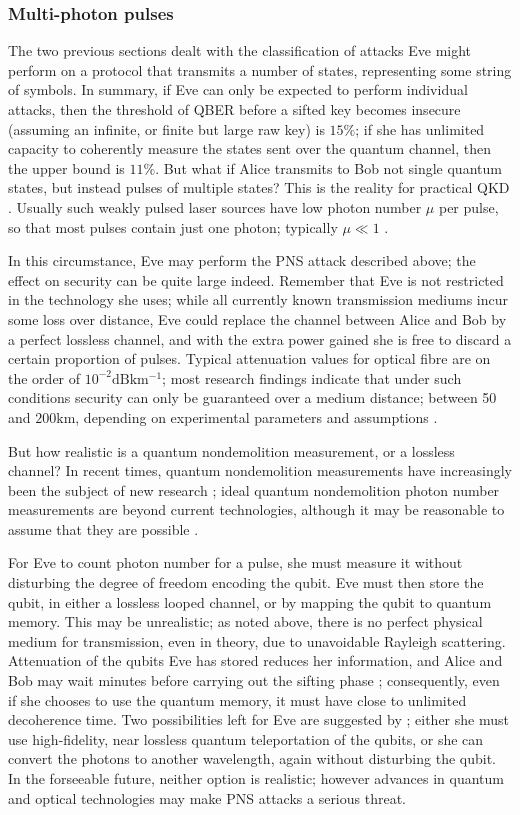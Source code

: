 \documentclass[paper=a4, fontsize=11pt]{scrartcl} %
\numberwithin{equation}{section} %
\numberwithin{figure}{section} %
\numberwithin{table}{section} %
\begin{document}
\subsubsection{Multi-photon pulses}
The two previous sections dealt with the classification of attacks Eve might perform on a protocol
that transmits a number of states, representing some string of symbols. In summary, if Eve can only be
expected to perform individual attacks, then the threshold of QBER before a sifted key becomes insecure
(assuming an infinite, or finite but large raw key) is $15\%$; if she has unlimited capacity to coherently measure
the states sent over the quantum channel, then the upper bound is $11\%$. But what if Alice transmits to Bob
not single quantum states, but instead pulses of multiple states? This is the reality for practical QKD \citep{huttner1995}.
Usually such weakly pulsed laser sources have low photon number $\mu$ per pulse, so that most pulses contain
just one photon; typically $\mu \ll 1$ \citep{reviewScariani}.

In this circumstance, Eve may perform the PNS attack described above; the effect on security can be quite large
indeed. Remember that Eve is not restricted in the technology she uses; while all currently known transmission
mediums incur some loss over distance, Eve could replace the channel between Alice and Bob by a perfect
lossless channel, and with the extra power gained she is free to discard a certain proportion of pulses. Typical
attenuation values for optical fibre are on the order of $10^{-2} \si{\dB \km^{-1}}$; most research findings indicate that
under such conditions security can only be guaranteed over a medium distance; between 50 and $200\si{\km}$, depending on experimental
parameters and assumptions \citep{perf2protocols, satellites, experimentalComparison}.

But how realistic is a quantum nondemolition measurement, or a lossless channel? In recent times,
quantum nondemolition measurements have increasingly been the subject of new research \citep{brassard2000};
ideal quantum nondemolition photon number measurements are beyond current technologies, although it may
be reasonable to assume that they are possible \citep{nogues1999}.

For Eve to count photon number for a pulse, she must measure it without disturbing the degree of
freedom encoding the qubit. Eve must then store the qubit, in either a lossless looped
channel, or by mapping the qubit to quantum memory. This may be unrealistic;
as noted above, there is no perfect physical medium
for transmission, even in theory, due to unavoidable Rayleigh scattering.
Attenuation of the qubits Eve has stored reduces her information, and Alice and Bob
may wait minutes before carrying out the sifting phase \citep{reviewScariani}; consequently, even if she chooses to
use the quantum memory, it must have close to unlimited decoherence time. Two possibilities left for Eve are suggested
by \citet{gisin2002}; either she must use high-fidelity, near lossless quantum teleportation of the qubits, or
she can convert the photons to another wavelength, again without disturbing the qubit. In the forseeable future,
neither option is realistic; however advances in quantum and optical technologies may make PNS attacks a serious threat.
\end{document}
